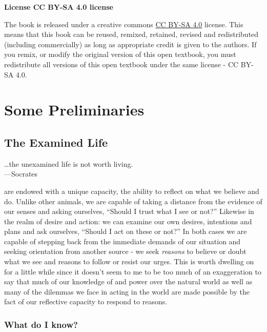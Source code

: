 \documentclass[justified]{tufte-book}
\newenvironment{epigraph}%
{
\begin{flushright}    
\begin{minipage}{20em}
\begin{flushright}
\itshape
}%
{
\end{flushright}
\end{minipage}
\end{flushright}
}
\begin{document}
\textbf{License CC BY-SA 4.0 license}

The book is released under a creative commons \href{https://creativecommons.org/licenses/by-sa/4.0/}{CC BY-SA 4.0} license. This means that this book can be reused, remixed, retained, revised and redistributed (including commercially) as long as appropriate credit is given to the authors. If you remix, or modify the original version of this open textbook, you must redistribute all versions of this open textbook under the same license - CC BY-SA 4.0.

\hypertarget{part-some-preliminaries}{%
\part*{Some Preliminaries}\label{part-some-preliminaries}}

\hypertarget{the-examined-life}{%
\chapter{The Examined Life}\label{the-examined-life}}

\begin{epigraph}
\ldots{}the unexamined life is not worth living.\\
---Socrates
\end{epigraph}

 are endowed with a unique capacity, the ability to reflect on what we believe and do. Unlike other animals, we are capable of taking a distance from the evidence of our senses and asking ourselves, ``Should I trust what I see or not?'' Likewise in the realm of desire and action: we can examine our own desires, intentions and plans and ask ourselves, ``Should I act on these or not?'' In both cases we are capable of stepping back from the immediate demands of our situation and seeking orientation from another source - we seek \emph{reasons} to believe or doubt what we see and reasons to follow or resist our urges. This is worth dwelling on for a little while since it doesn't seem to me to be too much of an exaggeration to say that much of our knowledge of and power over the natural world as well as many of the dilemmas we face in acting in the world are made possible by the fact of our reflective capacity to respond to reasons.

\hypertarget{what-do-i-know}{%
\section{What do I know?}\label{what-do-i-know}}
\end{document}
